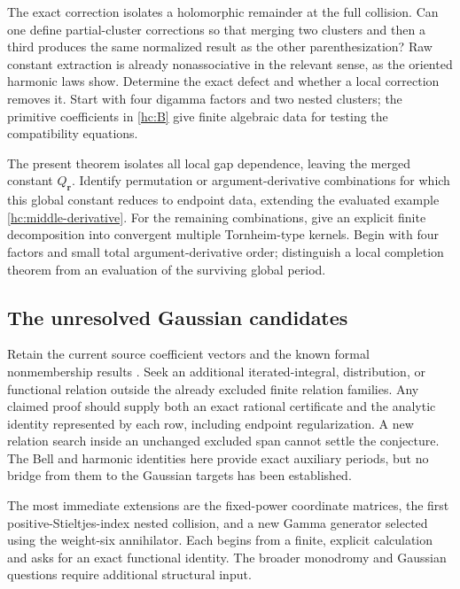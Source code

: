 \begin{question}
The exact correction isolates a holomorphic remainder at the full
collision. Can one define partial-cluster corrections so that merging
two clusters and then a third produces the same normalized result as
the other parenthesization? Raw constant extraction is already
nonassociative in the relevant sense, as the oriented harmonic laws
show. Determine the exact defect and whether a local correction
removes it. Start with four digamma factors and two nested clusters;
the primitive coefficients in \eqref{hc:B} give finite algebraic
data for testing the compatibility equations.
\end{question}

\begin{question}
The present theorem isolates all local gap dependence, leaving the
merged constant $Q_{\boldsymbol r}$. Identify permutation or
argument-derivative combinations for which this global constant
reduces to endpoint data, extending the evaluated example
\eqref{hc:middle-derivative}. For the remaining combinations,
give an explicit finite decomposition into convergent multiple
Tornheim-type kernels. Begin with four factors and small total
argument-derivative order; distinguish a local completion theorem
from an evaluation of the surviving global period.
\end{question}

\subsection{The unresolved Gaussian candidates}

\begin{question}
Retain the current source coefficient vectors and the known formal
nonmembership results \cite{RepoMain,RepoExactResonant}. Seek an
additional iterated-integral, distribution, or functional relation
outside the already excluded finite relation families. Any claimed
proof should supply both an exact rational certificate and the
analytic identity represented by each row, including endpoint
regularization. A new relation search inside an unchanged excluded
span cannot settle the conjecture. The Bell and harmonic identities
here provide exact auxiliary periods, but no bridge from them to
the Gaussian targets has been established.
\end{question}

The most immediate extensions are the fixed-power coordinate matrices,
the first positive-Stieltjes-index nested collision, and a new Gamma
generator selected using the weight-six annihilator. Each begins from
a finite, explicit calculation and asks for an exact functional
identity. The broader monodromy and Gaussian questions require
additional structural input.
